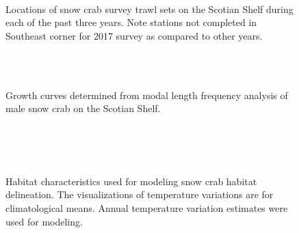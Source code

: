\documentclass[11pt]{article}
\newcommand{\D}{.}
\newcommand{\h}{C:/} %
\newcommand{\es}{bio.data/bio.snowcrab/} %
\newcommand{\eb}{bathymetry/}
\newcommand{\ea}{bio.data/aegis/}
\newcommand{\A}{assessments/}
\newcommand{\m}{output/maps/} %
\newcommand{\yr}{2017}
\newcommand{\yrminusone}{2016}
\newcommand{\yrminustwo}{2015}
\begin{document}

\begin{figure}
\centering
  \\
  \\
  \\
	\caption{Locations of snow crab survey trawl sets on the Scotian Shelf during each of the past three years. Note stations not completed in Southeast corner for 2017 survey as compared to other years.}
\end{figure}
\clearpage



\begin{figure}
    \centering
   \\
\\
\caption{Growth curves determined from modal length frequency analysis of male snow crab on the Scotian Shelf.}
\end{figure}
\clearpage




\begin{figure}
\centering
\\
\\
\\ 
\caption{Habitat characteristics used for modeling snow crab habitat delineation. The visualizations of temperature variations are for climatological means. Annual temperature variation estimates were used for modeling.}
\end{figure}
\clearpage
\end{document}

